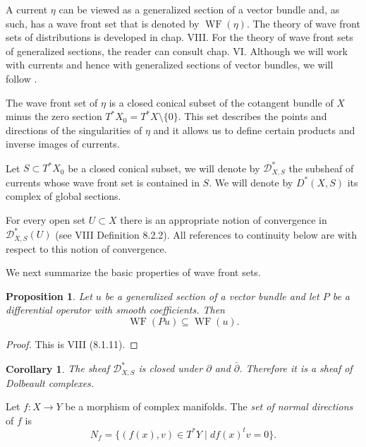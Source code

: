 \documentclass[10pt,twoside]{article}
\numberwithin{equation}{section}
\theoremstyle{plain}
\newtheorem{corollary}[equation]{Corollary}
\newtheorem{proposition}[equation]{Proposition}
\theoremstyle{definition}
\DeclareMathOperator{\WF}{WF}
\begin{document}
A current $\eta$ can be viewed as a generalized
section of a vector bundle and, as such, has a wave front set that is
denoted by
$\WF(\eta)$. The theory of wave front sets of distributions is
developed in \cite{Hormander:MR1065993} chap. VIII. For the theory of
wave front 
sets of generalized sections, the reader can consult
\cite{GuilleminStenberg:MR0516965} chap. VI. Although we will work
with currents and 
hence with generalized sections of vector bundles, we will follow
\cite{Hormander:MR1065993}. 

The wave front set
of $\eta$ is a closed conical subset of the cotangent bundle of $X$
minus the 
zero section 
$T^{\ast}X_{0}=T^{\ast}X\setminus \{0\}$. This set describes the
points and directions of the singularities of $\eta$ and it allows us
to define certain products and inverse images of currents.


Let $S\subset T^{\ast}X_{0}$ be a closed conical subset, we will denote by
$\mathscr{D}^{\ast}_{X,S}$ the subsheaf of currents whose wave front set
is contained in $S$. We will denote by  $D^{\ast}(X,S)$ its 
complex of global sections. 

For every open set $U\subset X$ there is an appropriate notion of
convergence in $\mathscr{D}^{\ast}_{X,S}(U)$ (see
\cite{Hormander:MR1065993} VIII  Definition 8.2.2). All references to
continuity below are with respect to this notion of convergence. 

We next summarize the basic properties of wave front sets.

\begin{proposition}\label{prop:4}
  Let $u$ be a generalized section of a vector bundle and let $P$ be a
  differential operator with smooth coefficients. Then
  \begin{displaymath}
    \WF(Pu)\subseteq \WF(u).
  \end{displaymath}
\end{proposition}
\begin{proof}
  This is \cite{Hormander:MR1065993} VIII (8.1.11).
\end{proof}

\begin{corollary}
  The sheaf $\mathscr{D}^{\ast}_{X,S}$ is closed under $\partial$ and $\bar
  \partial$. Therefore it is a sheaf of Dolbeault complexes.   
\end{corollary}


Let $f\colon X\longrightarrow Y$ be a morphism of complex
manifolds. The \emph{set of normal directions} of $f$ is
\begin{displaymath}
  N_{f}=\{(f(x),v)\in T^{\ast}Y \mid df(x)^{t}v=0\}.
\end{displaymath}
\end{document}
